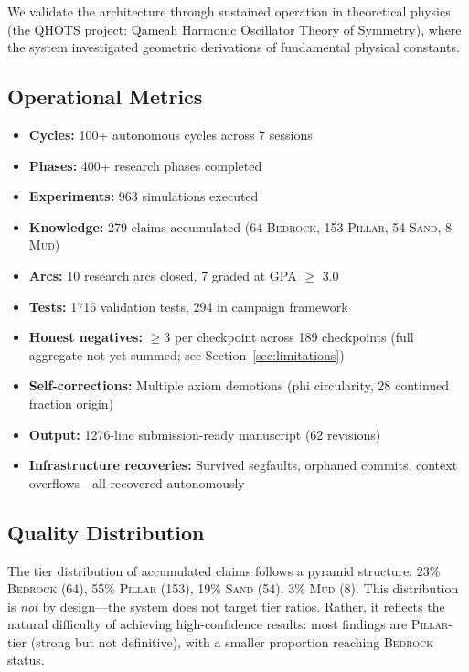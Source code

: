 \documentclass[11pt,a4paper]{article}
\newcommand{\qhots}{\textsc{QHOTS}}
\newcommand{\bedrock}{\textsc{Bedrock}}
\newcommand{\pillar}{\textsc{Pillar}}
\newcommand{\sand}{\textsc{Sand}}
\newcommand{\mud}{\textsc{Mud}}
\begin{document}
We validate the architecture through sustained operation in theoretical physics
(the \qhots{} project: Qameah Harmonic Oscillator Theory of Symmetry), where
the system investigated geometric derivations of fundamental physical constants.

\subsection{Operational Metrics}

\begin{itemize}[nosep]
    \item \textbf{Cycles:} 100+ autonomous cycles across 7 sessions
    \item \textbf{Phases:} 400+ research phases completed
    \item \textbf{Experiments:} 963 simulations executed
    \item \textbf{Knowledge:} 279 claims accumulated (64 \bedrock{}, 153 \pillar{},
          54 \sand{}, 8 \mud{})
    \item \textbf{Arcs:} 10 research arcs closed, 7 graded at GPA $\geq$ 3.0
    \item \textbf{Tests:} 1716 validation tests, 294 in campaign framework
    \item \textbf{Honest negatives:} $\geq$3 per checkpoint across 189 checkpoints
          (full aggregate not yet summed; see Section~\ref{sec:limitations})
    \item \textbf{Self-corrections:} Multiple axiom demotions (phi circularity,
          28 continued fraction origin)
    \item \textbf{Output:} 1276-line submission-ready manuscript (62 revisions)
    \item \textbf{Infrastructure recoveries:} Survived segfaults, orphaned commits,
          context overflows---all recovered autonomously
\end{itemize}

\subsection{Quality Distribution}

The tier distribution of accumulated claims follows a pyramid structure:
23\% \bedrock{} (64), 55\% \pillar{} (153),
19\% \sand{} (54), 3\% \mud{} (8). This distribution is \emph{not} by design---the
system does not target tier ratios. Rather, it reflects the natural difficulty of
achieving high-confidence results: most findings are \pillar{}-tier (strong but not
definitive), with a smaller proportion reaching \bedrock{} status.
\end{document}

